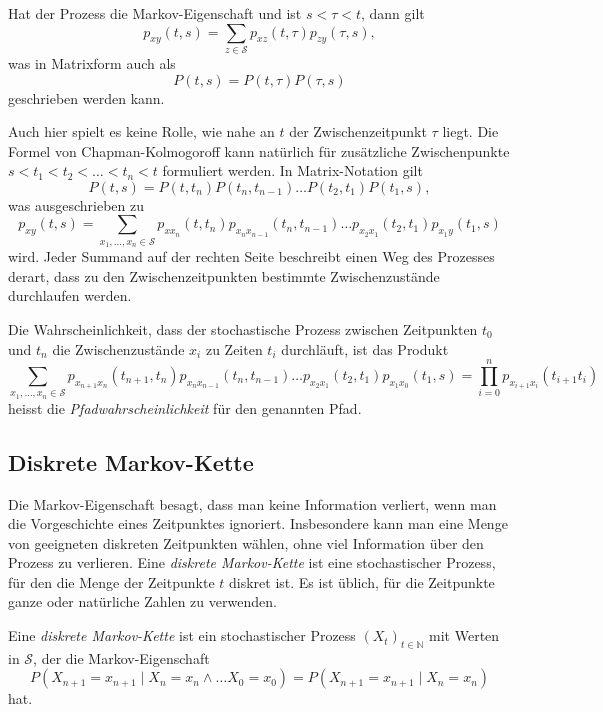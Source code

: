 \begin{satz}
Hat der Prozess die Markov-Eigenschaft und ist $s<\tau <t$, dann gilt
\[
p_{xy}(t,s) = \sum_{z\in\mathcal{S}} p_{xz}(t,\tau) p_{zy}(\tau,s),
\]
was in Matrixform auch als
\[
P(t,s) = P(t,\tau)P(\tau,s)
\]
geschrieben werden kann.
\end{satz}

Auch hier spielt es keine Rolle, wie nahe an $t$ der Zwischenzeitpunkt
$\tau$ liegt.
Die Formel von Chapman-Kolmogoroff kann natürlich für zusätzliche
Zwischenpunkte $s<t_1<t_2<\dots< t_n< t$ formuliert werden.
In Matrix-Notation gilt
\[
P(t,s) = P(t,t_n)P(t_n,t_{n-1})\dots P(t_2,t_1)P(t_1,s),
\]
was ausgeschrieben zu
\[
p_{xy}(t,s)
=
\sum_{x_1,\dots,x_n\in\mathcal{S}}
p_{xx_n}(t,t_n)
p_{x_nx_{n-1}}(t_n,t_{n-1})
\dots
p_{x_2x_1}(t_2,t_1)
p_{x_1y}(t_1,s)
\]
wird.
Jeder Summand auf der rechten Seite beschreibt einen Weg des Prozesses
derart, dass zu den Zwischenzeitpunkten bestimmte 
Zwischenzustände durchlaufen werden.

\begin{definition}
Die Wahrscheinlichkeit, dass der stochastische Prozess zwischen Zeitpunkten
$t_0$ und $t_n$ die Zwischenzustände $x_i$ zu Zeiten $t_i$ durchläuft, ist
das Produkt
\[
\sum_{x_1,\dots,x_n\in\mathcal{S}}
p_{x_{n+1}x_n}(t_{n+1},t_n)
p_{x_nx_{n-1}}(t_n,t_{n-1})
\dots
p_{x_2x_1}(t_2,t_1)
p_{x_1x_0}(t_1,s)
=
\prod_{i=0}^{n}
p_{x_{i+1}x_i}(t_{i+1}t_i)
\]
heisst die {\em Pfadwahrscheinlichkeit} für den genannten Pfad.
%
\end{definition}

%
%
\subsection{Diskrete Markov-Kette}
Die Markov-Eigenschaft besagt, dass man keine Information verliert,
wenn man die Vorgeschichte eines Zeitpunktes ignoriert.
Insbesondere kann man eine Menge von geeigneten diskreten
Zeitpunkten wählen, ohne viel Information über den Prozess zu
verlieren.
Eine {\em diskrete Markov-Kette} ist eine stochastischer Prozess,
für den die Menge der Zeitpunkte $t$ diskret ist.
Es ist üblich, für die Zeitpunkte ganze oder natürliche Zahlen zu
verwenden.

\begin{definition}
Eine {\em diskrete Markov-Kette} ist ein stochastischer Prozess
$(X_t)_{t\in\mathbb{N}}$ mit Werten in $\mathcal{S}$, der die
Markov-Eigenschaft
\[
P(X_{n+1}=x_{n+1}\mid X_n=x_n\wedge\dots X_0=x_0)
=
P(X_{n+1}=x_{n+1}\mid X_n=x_n)
\]
hat.
\end{definition}
%
%


